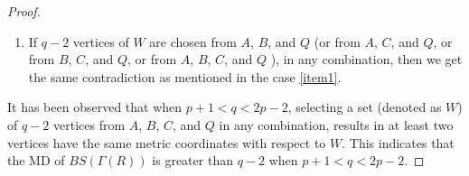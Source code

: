 \documentclass[10pt,a4paper]{amsart}
\begin{document}
\begin{proof}
\begin{enumerate}
\begin{itemize}
\begin{enumerate}
\begin{enumerate}
        \end{enumerate}
    \item  If only one set say, $B^{\nu_1}$  (or $C^{\nu_2}$), where $1\leq \nu_1,\nu_2 \leq \frac{p-1}{2}$, having one vertex of $W$, say $b^{\nu_1}_i$ and remaining sets have more than one or do not have any vertices of $W$, then we get the similar contradiction as mentioned in case \ref{item 9}
   \item If all sets $B^{\nu_1}$ and $C^{\nu_2}$ (Where $1\leq \nu_1,\nu_2 \leq \frac{p-1}{2})$ either contain more than one vertex of $W$ or do not contain any vertex of $W$, then we encounter the similar contradiction as mentioned in the case \ref{item 9}.
      \end{enumerate} 
 \end{itemize}
\item  If $q-2$ vertices of $W$ are chosen from $A$, $B$, and $Q$ (or from $A$, $C$, and $Q$, or from $B$, $C$, and $Q$, or from $A$, $B$, $C$, and $Q$ ), in any combination, then we get the same contradiction as mentioned in the case \ref{item1}.
\end{enumerate}
 It has been observed that when $p+1< q < 2p-2$, selecting a set (denoted as $W$) of $q-2$ vertices from $A$, $B$, $C$, and $Q$ in any combination, results in at least two vertices have the same metric coordinates with respect to $W$. This indicates that the MD of  $BS(\Gamma(R))$ is greater than $q-2$ when $p+1< q < 2p-2$.
 \end{proof}
\end{document}
